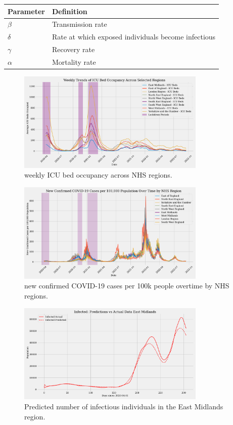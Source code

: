 \documentclass[12pt]{article}
\begin{document}
\begin{tabular}{ll}
\toprule
\textbf{Parameter} & \textbf{Definition} \\
\midrule
$\beta$ & Transmission rate \\
$\delta$ & Rate at which exposed individuals become infectious \\
$\gamma$ & Recovery rate \\
$\alpha$ & Mortality rate \\
\bottomrule
\end{tabular}

\begin{figure}[ht]
    \centering
    \includegraphics[width=0.8\textwidth]{"images/weekly_icu_beds_occupancy.pdf"}
    \caption{weekly ICU bed occupancy across NHS regions.}
    \label{fig:ICU_beds_occupancy}
\end{figure}


\begin{figure}[ht]
    \centering
    \includegraphics[width=0.8\textwidth]{"images/new_confirmed_per_100k.pdf"}
    \caption{new confirmed COVID-19 cases per 100k people overtime by NHS regions.}
    \label{fig:new_confirmed_per_100k}
\end{figure}

\begin{figure}[ht]
    \centering
    \includegraphics[width=0.8\textwidth]{images/pinn/I_predictions_East Midlands.pdf}
    \caption{Predicted number of infectious individuals in the East Midlands region.}
    \label{fig:I_predictions_East_Midlands}
\end{figure}
\end{document}
